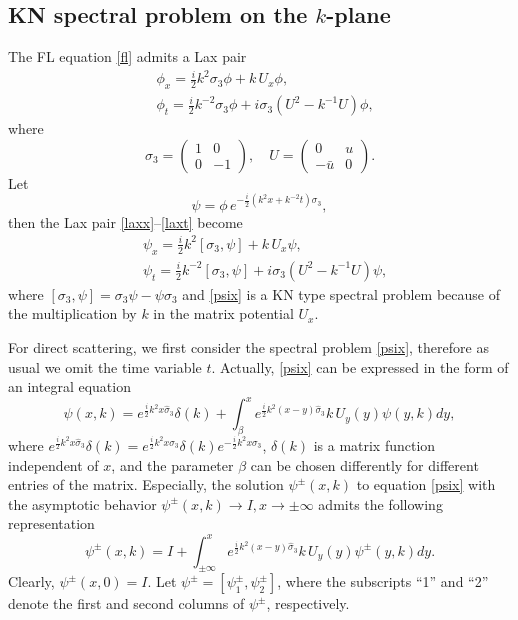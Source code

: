 \documentclass[preprint,compress,12pt]{elsarticle}
\numberwithin{equation}{section}
\begin{document}
\subsection{KN spectral problem on the $k$-plane}\label{sub21}
The FL equation \eqref{fl} admits a Lax pair \cite{Chengglo}
\begin{align}
&\phi_{x}=\frac{i}{2}k^{2}\sigma_{3}\phi+k\,U_{x}\phi,\label{laxx}\\
&\phi_{t}=\frac{i}{2}k^{-2}\sigma_{3}\phi+i\sigma_{3}\left(U^{2}-k^{-1}U\right)\phi,\label{laxt}
\end{align}
where
\begin{equation*}
\sigma_{3}=\begin{pmatrix}1&0\\
0&-1\end{pmatrix}, \quad U=\begin{pmatrix}0&u\\
-\bar{u}&0\end{pmatrix}.
\end{equation*}
Let
$$\psi=\phi\, e^{-\frac{i}{2}(k^{2}x+k^{-2}t)\sigma_{3}}, $$
then the Lax pair \eqref{laxx}--\eqref{laxt}  become
\begin{align}
&\psi_{x}=\frac{i}{2}k^{2}\left[\sigma_{3},\psi\right]+k\,U_{x}\psi,\label{psix} \\
&\psi_{t}=\frac{i}{2}k^{-2}\left[\sigma_{3},\psi\right]+i\sigma_{3}\left(U^{2}-k^{-1}U\right)\psi,\label{psit}
\end{align}
where $[\sigma_{3}, \psi]=\sigma_{3}\psi-\psi\sigma_{3}$  and \eqref{psix} is a KN type spectral problem because of  the multiplication by $k$ in the matrix potential $U_{x}$.

For  direct scattering, we first consider the spectral problem \eqref{psix}, therefore as usual we omit the time variable $t$.
Actually, \eqref{psix} can be expressed in the form of an integral equation
\begin{equation*}
\psi(x,k)=e^{\frac{i}{2}k^{2}x\widehat{\sigma}_{3}}\delta(k)+\int_{\beta}^{x}e^{\frac{i}{2}k^{2}(x-y)\widehat{\sigma}_{3}}k\,U_{y}(y)\psi(y,k)dy,
\end{equation*}
where $e^{\frac{i}{2}k^{2}x\widehat{\sigma}_{3}}\delta(k)=e^{\frac{i}{2}k^{2}x\sigma_{3}}\delta(k) e^{-\frac{i}{2}k^{2}x\sigma_{3}}$, $\delta(k)$ is a matrix function independent of $x$,  and the parameter $\beta$ can be chosen differently for different entries of the matrix. Especially, the solution $\psi^{\pm}(x,k)$ to equation \eqref{psix} with the asymptotic behavior
$\psi^{\pm}(x,k)\rightarrow I, x\rightarrow\pm\infty$ admits the following representation
\begin{equation}\label{vo}
\psi^{\pm}(x,k)=I+\int_{\pm\infty}^{x}e^{\frac{i}{2}k^{2}(x-y)\widehat{\sigma}_{3}}k\,U_{y}(y)\psi^{\pm}(y,k)dy.
\end{equation}
Clearly, $\psi^{\pm}(x,0)=I$. Let $\psi^{\pm}=\left[\psi_{1}^{\pm},\psi_{2}^{\pm}\right]$, where the subscripts ``1'' and ``2'' denote the first and second columns of $\psi^{\pm}$,  respectively.
\end{document}
